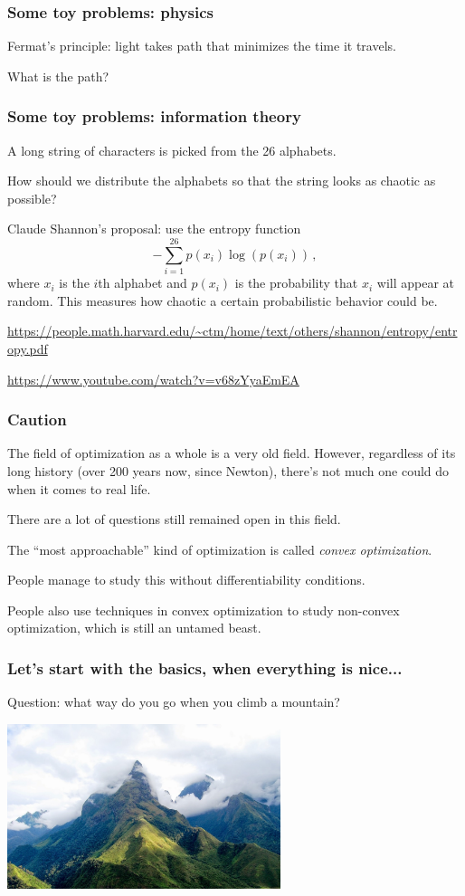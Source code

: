 \documentclass[aspectratio=169]{beamer}
\begin{document}
\begin{frame}
    \frametitle{Some toy problems: physics}
    Fermat's principle: light takes path that minimizes the time it travels.

    What is the path?
\end{frame}


\begin{frame}
    \frametitle{Some toy problems: information theory}
    A long string of characters is picked from the 26 alphabets.

    How should we distribute the alphabets so that the string looks as chaotic as possible?
    \pause

    Claude Shannon's proposal: use the entropy function
    \begin{equation*}
        - \sum_{i=1}^{26} p(x_i) \log (p(x_i)) \,,
    \end{equation*}
    where $x_i$ is the $i$th alphabet and $p(x_i)$ is the probability that $x_i$ 
    will appear at random.
    This measures how chaotic a certain probabilistic behavior could be.

    \url{https://people.math.harvard.edu/~ctm/home/text/others/shannon/entropy/entropy.pdf}

    \url{https://www.youtube.com/watch?v=v68zYyaEmEA}
\end{frame}

\begin{frame}
    \frametitle{Caution}
    The field of optimization as a whole is a very old field.
    However, regardless of its long history (over 200 years now, since Newton),
    there's not much one could do when it comes to real life. 

    There are a lot of questions still remained open in this field. 

    The ``most approachable'' kind of optimization is called \emph{convex optimization}. \pause
    
    People manage to study this without differentiability conditions. \pause

    People also use techniques in convex optimization to study 
    non-convex optimization, which is still an untamed beast.
\end{frame}

\begin{frame}
    \frametitle{Let's start with the basics, when everything is nice...}
    Question: what way do you go when you climb a mountain?

    \includegraphics[width = 0.6\textwidth]{fansipan.jpg} 

\end{frame}
\end{document}
